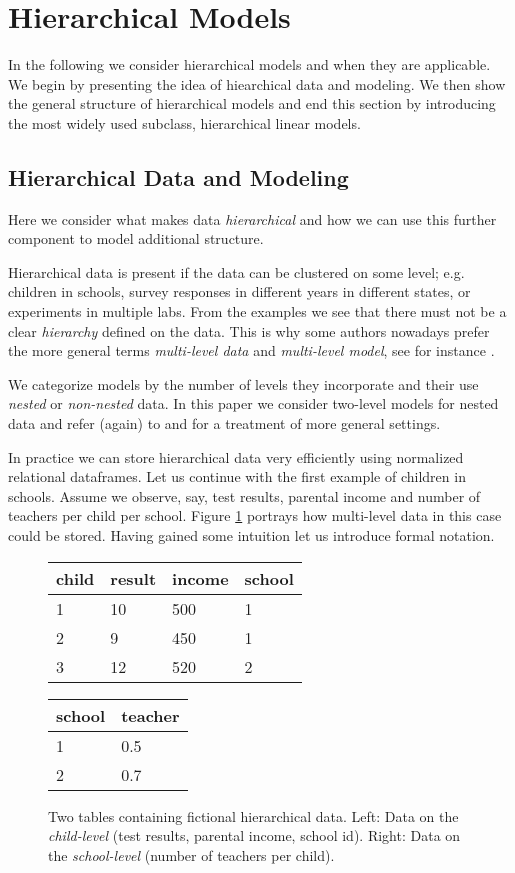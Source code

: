 \section{Hierarchical Models}
\label{sec:hierachical_modeling}
In the following we consider hierarchical models and when they are applicable.
We begin by presenting the idea of hiearchical data and modeling.
We then show the general structure of hierarchical models and end this section by introducing the most widely used subclass, hierarchical linear models.

\subsection{Hierarchical Data and Modeling}
Here we consider what makes data \emph{hierarchical} and how we can use this further component to model additional structure.

Hierarchical data is present if the data can be clustered on some level; e.g. children in schools, survey responses in different years in different states, or experiments in multiple labs.
From the examples we see that there must not be a clear \emph{hierarchy} defined on the data.
This is why some authors nowadays prefer the more general terms \emph{multi-level data} and \emph{multi-level model}, see for instance \citet{GelmanHill2007}.

We categorize models by the number of levels they incorporate and their use \emph{nested} or \emph{non-nested} data.
In this paper we consider two-level models for nested data and refer (again) to \citet{GelmanHill2007} and \citet{snijders1999} for a treatment of more general settings.

In practice we can store hierarchical data very efficiently using normalized relational dataframes.
Let us continue with the first example of children in schools.
Assume we observe, say, test results, parental income and number of teachers per child per school.
Figure \ref{fig:relational_table} portrays how multi-level data in this case could be stored.
Having gained some intuition let us introduce formal notation.
\begin{figure}[!ht]
\begin{center}
\begin{tabular}{l l l l}
child & result & income & school\\
\hline
1 & 10 & 500 & 1\\
2 & 9 & 450 & 1\\
3 & 12 & 520 & 2
\end{tabular}
\quad
\begin{tabular}{l l}
school & teacher\\
\hline
1 & 0.5\\
2 & 0.7
\end{tabular}
\end{center}
\caption{Two tables containing fictional hierarchical data. Left: Data on the \emph{child-level} (test results, parental income, school id). Right: Data on the \emph{school-level} (number of teachers per child).}
\label{fig:relational_table}
\end{figure}

